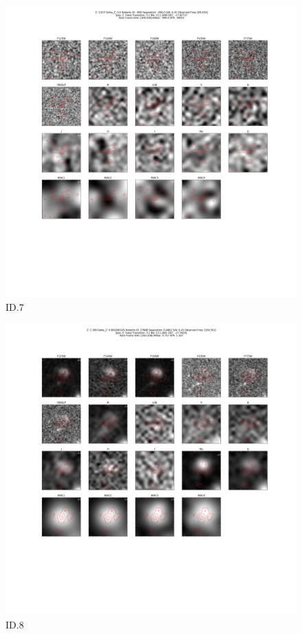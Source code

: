 \begin{figure}[tbp]
\centering \includegraphics[width=120mm]{Matched/ASPECS_Cutout_7.png}
\caption{ID.7}
\label{fig:Match_Three}
\end{figure}

\begin{figure}[tbp]
\centering \includegraphics[width=120mm]{Matched/ASPECS_Cutout_8.png}
\caption{ID.8}
\label{fig:Match_Three}
\end{figure}

